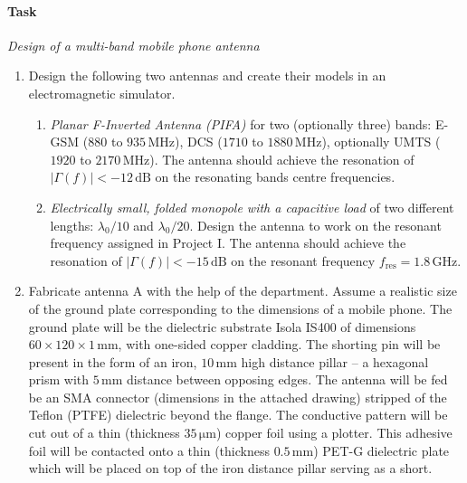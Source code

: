 \documentclass[11pt,a4paper]{article}
\begin{document}
    \paragraph{Task} \emph{Design of a multi-band mobile phone antenna}
    \begin{enumerate}[label=\arabic*.]
        \item Design the following two antennas and create their models in an electromagnetic simulator.
        \begin{enumerate}[label=\Alph*.]
            \item \emph{Planar F-Inverted Antenna (PIFA)} for two (optionally three) bands: E-GSM ($880$ to $935\,\mathrm{MHz}$), DCS ($1710$ to $1880\,\mathrm{MHz}$), optionally UMTS ($1920$ to $2170\,\mathrm{MHz}$). The antenna should achieve the resonation of $|\Gamma(f)| < -12\,\mathrm{dB}$ on the resonating bands centre frequencies.
            \item \emph{Electrically small, folded monopole with a capacitive load} of two different lengths: $\lambda_0/10$ and $\lambda_0/20$. Design the antenna to work on the resonant frequency assigned in Project I. The antenna should achieve the resonation of $|\Gamma(f)| < -15\,\mathrm{dB}$ on the resonant frequency $f_{\mathrm{res}} = 1.8\,\mathrm{GHz}$.
        \end{enumerate}

        \item Fabricate antenna A with the help of the department. Assume a realistic size of the ground plate corresponding to the dimensions of a mobile phone. The ground plate will be the dielectric substrate Isola IS400 of dimensions $60 \times 120 \times 1\, \mathrm{mm}$, with one-sided copper cladding. The shorting pin will be present in the form of an iron, $10\, \mathrm{mm}$ high distance pillar -- a hexagonal prism with $5\, \mathrm{mm}$ distance between opposing edges. The antenna will be fed be an SMA connector (dimensions in the attached drawing) stripped of the Teflon (PTFE) dielectric beyond the flange. The conductive pattern will be cut out of a thin (thickness $35\, \mathrm{\mu m}$) copper foil using a plotter. This adhesive foil will be contacted onto a thin (thickness $0.5\, \mathrm{mm}$) PET-G dielectric plate which will be placed on top of the iron distance pillar serving as a short.
        

\end{enumerate}
\end{document}
